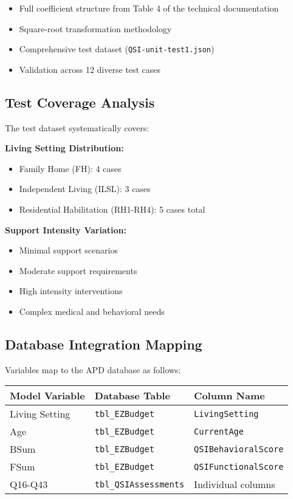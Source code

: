 \begin{itemize}
    \item Full coefficient structure from Table 4 of the technical documentation
    \item Square-root transformation methodology
    \item Comprehensive test dataset (\texttt{QSI-unit-test1.json})
    \item Validation across 12 diverse test cases
\end{itemize}

\subsection{Test Coverage Analysis}

The test dataset systematically covers:

\textbf{Living Setting Distribution:}
\begin{itemize}
    \item Family Home (FH): 4 cases
    \item Independent Living (ILSL): 3 cases
    \item Residential Habilitation (RH1-RH4): 5 cases total
\end{itemize}

\textbf{Support Intensity Variation:}
\begin{itemize}
    \item Minimal support scenarios
    \item Moderate support requirements
    \item High intensity interventions
    \item Complex medical and behavioral needs
\end{itemize}

\subsection{Database Integration Mapping}

Variables map to the APD database as follows:

\begin{center}
\begin{tabular}{|l|l|l|}
\hline
\textbf{Model Variable} & \textbf{Database Table} & \textbf{Column Name} \\
\hline
Living Setting & \texttt{tbl\_EZBudget} & \texttt{LivingSetting} \\
Age & \texttt{tbl\_EZBudget} & \texttt{CurrentAge} \\
BSum & \texttt{tbl\_EZBudget} & \texttt{QSIBehavioralScore} \\
FSum & \texttt{tbl\_EZBudget} & \texttt{QSIFunctionalScore} \\
Q16-Q43 & \texttt{tbl\_QSIAssessments} & Individual columns \\
\hline
\end{tabular}
\end{center}

